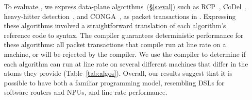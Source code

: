 To evaluate \pktlanguage, we express data-plane algorithms~(\S\ref{s:eval})
such as RCP~\cite{rcp}, CoDel~\cite{codel}, heavy-hitter
detection~\cite{opensketch}, and CONGA~\cite{conga}, as packet transactions in
\pktlanguage. Expressing these algorithms involved a straightforward
translation of each algorithm's reference code to \pktlanguage syntax.  The
\pktlanguage compiler guarantees deterministic performance for these
algorithms: all packet transactions that compile run at line rate on a
\absmachine machine, or will be rejected by the compiler.  We use the
\pktlanguage compiler to determine if each algorithm can run at line rate on
several different \absmachine machines that differ in the atoms they provide
(Table~\ref{tab:algos}). Overall, our results suggest that it is possible to
have both a familiar programming model, resembling DSLs for software routers
and NPUs, and line-rate performance.
